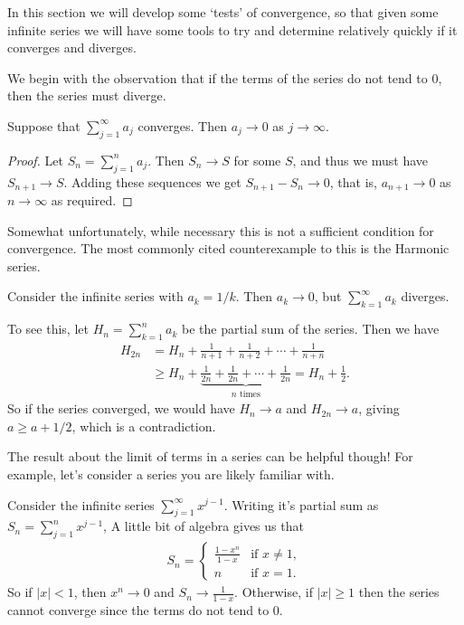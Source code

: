\documentclass[a4paper]{scrartcl}
\begin{document}
In this section we will develop some `tests' of convergence, so that given some infinite series we will have some tools to try and determine relatively quickly if it converges and diverges.

We begin with the observation that if the terms of the series do not tend to 0, then the series must diverge.

\begin{proposition}\label{prop:limit-of-terms}
	Suppose that $\sum_{j = 1}^{\infty} a_j$ converges. Then $a_j \rightarrow 0$ as $j \rightarrow \infty$.
\end{proposition}
\begin{proof}
	Let $S_n = \sum_{j = 1}^{n} a_j$. Then $S_n \rightarrow S$ for some $S$, and thus we must have $S_{n + 1} \rightarrow S$. Adding these sequences we get $S_{n+1} - S_{n} \rightarrow 0$, that is, $a_{n + 1} \rightarrow 0$ as $n \rightarrow \infty$ as required.
\end{proof}

Somewhat unfortunately, while necessary this is not a sufficient condition for convergence. The most commonly cited counterexample to this is the Harmonic series.

\begin{example}
	Consider the infinite series with $a_k = 1/k$. Then $a_k \rightarrow 0$, but $\sum_{k = 1}^\infty a_k$ diverges.

	To see this, let $H_n = \sum_{k = 1}^n a_k$ be the partial sum of the series. Then we have
	\begin{align*}
		H_{2n} &= H_n + \frac{1}{n + 1} + \frac{1}{n + 2} + \cdots + \frac{1}{n + n} \\
		&\geq  H_n + \underbrace{\frac{1}{2n} + \frac{1}{2n} + \cdots + \frac{1}{2n}}_{\text{$n$ times}} = H_n + \frac{1}{2}.
	\end{align*}
	So if the series converged, we would have $H_n \rightarrow a$ and $H_{2n} \rightarrow a$, giving $a \geq a + 1/2$, which is a contradiction.
\end{example}

The result about the limit of terms in a series can be helpful though! For example, let's consider a series you are likely familiar with.

\begin{example}
		Consider the infinite series $\sum_{j = 1}^{\infty} x^{j - 1}$. Writing it's partial sum as
	$S_n = \sum_{j = 1}^{n} x^{j-1}$,
	A little bit of algebra gives us that
	\begin{align*}
		S_n = \begin{cases}
        \frac{1 - x^n}{1 - x} &\mbox{if } x \neq 1, \\
        n &\mbox{if } x = 1.
       \end{cases}
	\end{align*}
	So if $|x| < 1$, then $x^n \rightarrow 0$ and $S_n \rightarrow \frac{1}{1 - x}$. Otherwise, if $|x| \geq 1$ then the series cannot converge since the terms do not tend to 0.
\end{example}
\end{document}
